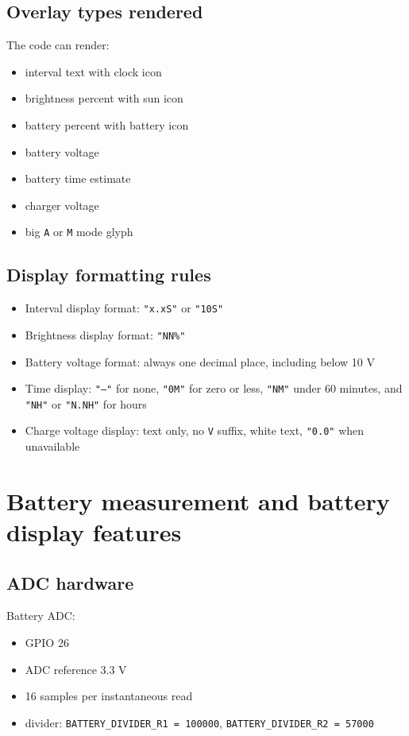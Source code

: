 \documentclass[11pt]{article}
\begin{document}
\subsection{Overlay types rendered}
The code can render:
\begin{itemize}
  \item interval text with clock icon
  \item brightness percent with sun icon
  \item battery percent with battery icon
  \item battery voltage
  \item battery time estimate
  \item charger voltage
  \item big \texttt{A} or \texttt{M} mode glyph
\end{itemize}

\subsection{Display formatting rules}
\begin{itemize}
  \item Interval display format: \texttt{"x.xS"} or \texttt{"10S"}
  \item Brightness display format: \texttt{"NN\%"}
  \item Battery voltage format: always one decimal place, including below 10 V
  \item Time display: \texttt{"--"} for none, \texttt{"0M"} for zero or less, \texttt{"NM"} under 60 minutes, and \texttt{"NH"} or \texttt{"N.NH"} for hours
  \item Charge voltage display: text only, no \texttt{V} suffix, white text, \texttt{"0.0"} when unavailable
\end{itemize}

\section{Battery measurement and battery display features}
\subsection{ADC hardware}
Battery ADC:
\begin{itemize}
  \item GPIO 26
  \item ADC reference 3.3 V
  \item 16 samples per instantaneous read
  \item divider: \texttt{BATTERY\_DIVIDER\_R1 = 100000}, \texttt{BATTERY\_DIVIDER\_R2 = 57000}
\end{itemize}
\end{document}
